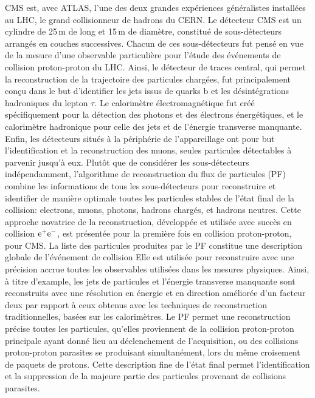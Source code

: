\documentclass[11pt,twoside,a4paper,tdr]{cms-tdr}
\begin{document}
CMS est, avec ATLAS, l'une des deux grandes expériences généralistes installées au LHC, le grand collisionneur de hadrons du CERN.
Le détecteur CMS est un cylindre de 25\,m de long et 15\,m de diamètre, constitué de sous-détecteurs arrangés en couches successives. 
Chacun de ces sous-détecteurs fut pensé en vue de la mesure d'une observable particulière pour l'étude des événements de collision proton-proton du LHC. 
Ainsi, le détecteur de traces central, qui permet la reconstruction de la trajectoire des particules chargées, fut principalement conçu dans le but d'identifier les jets issus de quarks b et les désintégrations hadroniques du lepton $\tau$. 
Le calorimètre électromagnétique fut créé spécifiquement pour la détection des photons et des électrons énergétiques, et le calorimètre hadronique pour celle des jets et de l'énergie transverse manquante. 
Enfin, les détecteurs situés à la périphérie de l'appareillage ont pour but l'identification et la reconstruction des muons, 
seules particules détectables à parvenir jusqu'à eux. 
Plutôt que de considérer les sous-détecteurs indépendamment, l'algorithme de reconstruction du flux de particules (PF) combine les informations de tous les sous-détecteurs pour reconstruire et identifier de manière optimale toutes les particules stables de l'état final de la collision: electrons, muons, photons, hadrons chargés, et hadrons neutres. 
Cette approche novatrice de la reconstruction, développée et utilisée avec succès en collision $\rm e^+e^-$, 
est présentée pour la première fois en collision proton-proton, pour CMS.  
La liste des particules produites par le PF constitue une description globale de l'événement de collision Elle est utilisée pour reconstruire avec une précision accrue toutes les observables utilisées dans les mesures physiques. 
Ainsi, à titre d'example, les jets de particules et l'énergie transverse manquante sont reconstruits avec une résolution en énergie et en direction améliorée d'un facteur deux par rapport à ceux obtenus avec les techniques de reconstruction traditionnelles, basées sur les calorimètres. 
Le PF permet une reconstruction précise toutes les particules, qu'elles proviennent de la collision proton-proton principale ayant donné lieu au déclenchement de l'acquisition, ou des collisions proton-proton parasites se produisant simultanément, lors du même croisement de paquets de protons. 
Cette description fine de l'état final permet l'identification et la suppression de la majeure partie des particules provenant de collisions parasites. 
\end{document}
